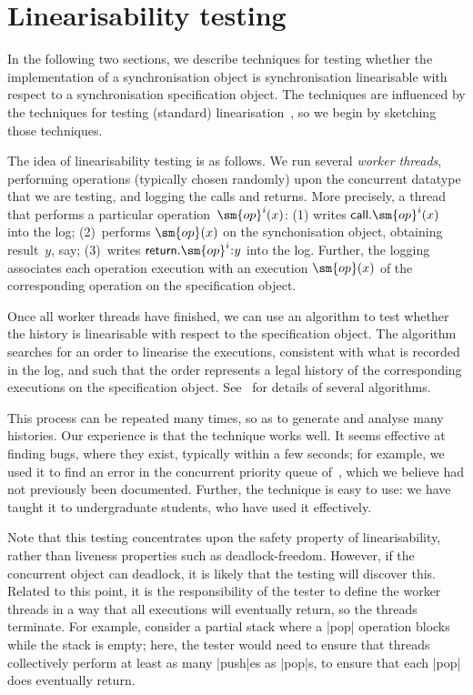 \section{Linearisability testing}
\label{sec:lin-testing}

In the following two sections, we describe techniques for testing whether the
implementation of a synchronisation object is synchronisation linearisable
with respect to a synchronisation specification object.
%
The techniques are influenced by the techniques for testing (standard)
linearisation~\cite{gavin:lin-testing}, so we begin by sketching those
techniques.

The idea of linearisability testing is as follows.  We run several
\emph{worker threads}, performing operations (typically chosen randomly) upon
the concurrent datatype that we are testing, and logging the calls and
returns.  More precisely, a thread that performs a particular
operation~$\sm{op}^i(x)$: (1) writes $\call.\sm{op}^i(x)$ into the log;
(2)~performs $\sm{op}(x)$ on the synchonisation object, obtaining result~$y$,
say; (3)~writes $\return.\sm{op}^i \:: y$ into the log.  Further, the logging
associates each operation execution with an execution $\sm{op}(x)$ of the
corresponding operation on the specification object.

Once all worker threads have finished, we can use an algorithm to test whether
the history is linearisable with respect to the specification object.  The
algorithm searches for an order to linearise the executions, consistent with
what is recorded in the log, and such that the order represents a legal
history of the corresponding executions on the specification object.
See~\cite{gavin:lin-testing} for details of several algorithms.

This process can be repeated many times, so as to generate and analyse many
histories.  Our experience is that the technique works well.  It seems
effective at finding bugs, where they exist, typically within a few seconds;
for example, we used it to find an error in the concurrent priority queue
of~\cite{faulty-pri-queue}, which we believe had not previously been
documented.  Further, the technique is easy to use: we have taught it to
undergraduate students, who have used it effectively.

Note that this testing concentrates upon the safety property of
linearisability, rather than liveness properties such as deadlock-freedom.
However, if the concurrent object can deadlock, it is likely that the testing
will discover this.  Related to this point, it is the responsibility of the
tester to define the worker threads in a way that all executions will
eventually return, so the threads terminate.  For example, consider a partial
stack where a |pop| operation blocks while the stack is empty; here, the
tester would need to ensure that threads collectively perform at least as many
|push|es as |pop|s, to ensure that each |pop| does eventually return.

